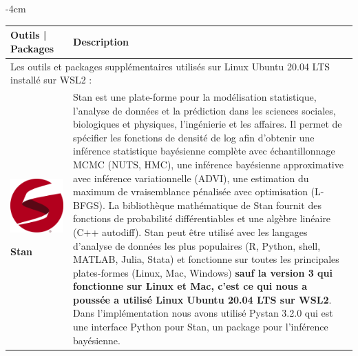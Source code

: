 \newpage

\begin{table}[H]
	\centering
	\addtolength{\leftskip} {-4cm}
	\addtolength{\rightskip}{-4.5cm}
	\begin{tabular}{|m{5cm}|m{12cm}|}
	\hline
	\rowcolor{blueforest}
	\color{white} \textbf{Outils | Packages} & \color{white} \textbf{Description}  \\
	\hline\hline
	\multicolumn{2}{|m{17cm}|}{\centering Les outils et packages supplémentaires utilisés sur Linux Ubuntu 20.04 LTS installé sur WSL2 : }\\ \hline
	\begin{center}
	    \begin{minipage}{.3\textwidth}
      \includegraphics[width=\textwidth]{images/chapitre7/stan.png}
    \end{minipage}
	\end{center}
	\centering \textbf{Stan} & Stan \cite{stan} est une plate-forme pour la modélisation statistique, l’analyse de données et la prédiction dans les sciences sociales, biologiques et physiques, l’ingénierie et les affaires. Il permet de spécifier les fonctions de densité de log afin d’obtenir une inférence statistique bayésienne complète avec échantillonnage MCMC (NUTS, HMC), une inférence bayésienne approximative avec inférence variationnelle (ADVI), une estimation du maximum de vraisemblance pénalisée avec optimisation (L-BFGS). La bibliothèque mathématique de Stan fournit des fonctions de probabilité différentiables et une algèbre linéaire (C++ autodiff). Stan peut être utilisé avec les langages d’analyse de données les plus populaires (R, Python, shell, MATLAB, Julia, Stata) et fonctionne sur toutes les principales plates-formes (Linux, Mac, Windows) \textbf{sauf la version 3 qui fonctionne sur Linux et Mac, c’est ce qui nous a poussée a utilisé Linux Ubuntu 20.04 LTS sur WSL2}. Dans l’implémentation nous avons utilisé Pystan 3.2.0 \cite{pystan} qui est une interface Python pour Stan, un package pour l'inférence bayésienne. \\ \hline

\end{tabular}
\end{table}
